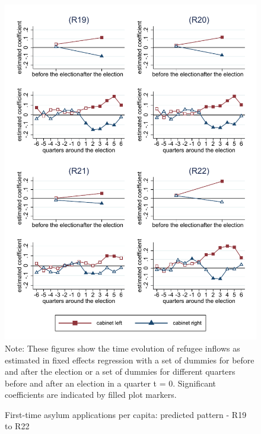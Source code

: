 \documentclass[11pt,a4paper]{scrartcl}
\begin{document}
\clearpage
\FloatBarrier
\begin{figure}[!ht]
	\caption{First-time asylum applications per capita: predicted pattern - R19 to R22}
	\includegraphics[width=1\textwidth]{../results/applications/app_graphs_R19-R22.pdf}
	\scriptsize{Note: These figures show the time evolution of refugee inflows as estimated in fixed effects regression
		with a set of dummies for before and after the election or a set of dummies for different quarters before and after an election in a quarter t = 0. Significant coefficients are indicated by filled plot markers.}
\end{figure}

\clearpage
\FloatBarrier



\clearpage
\FloatBarrier


\end{document}
